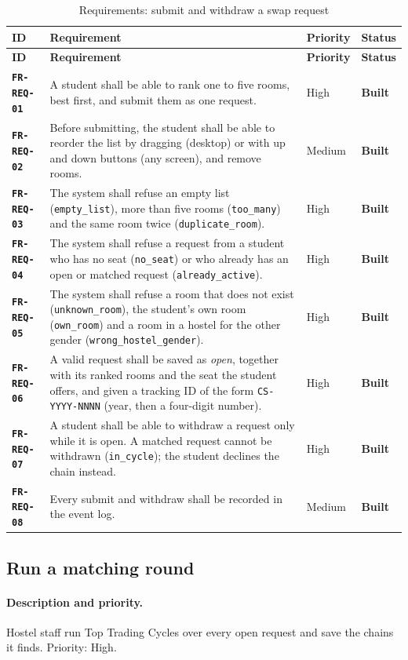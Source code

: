 \documentclass[11pt,a4paper,parskip=half,toc=listof]{scrreprt}
\newcommand{\Built}{\textcolor{builtgreen}{\textbf{Built}}}
\newcommand{\Req}[1]{\textbf{\texttt{#1}}}
\newcommand{\ReqHeader}{%
  \toprule
  \textbf{ID} & \textbf{Requirement} & \textbf{Priority} & \textbf{Status}\\
  \midrule}
\begin{document}
\begin{xltabular}{\linewidth}{@{}L{2.25cm}YL{1.55cm}L{1.6cm}@{}}
  \caption{Requirements: submit and withdraw a swap request}\label{tab:fr-req}\\
  \ReqHeader
  \endfirsthead
  \ReqHeader
  \endhead
  \bottomrule
  \endlastfoot
  \Req{FR-REQ-01} & A student shall be able to rank one to five rooms, best
    first, and submit them as one request. & High & \Built\\
  \Req{FR-REQ-02} & Before submitting, the student shall be able to
    reorder the list by dragging (desktop) or with up and down buttons
    (any screen), and remove rooms. & Medium & \Built\\
  \Req{FR-REQ-03} & The system shall refuse an empty list
    (\texttt{empty\_list}), more than five rooms (\texttt{too\_many}) and
    the same room twice (\texttt{duplicate\_room}). & High & \Built\\
  \Req{FR-REQ-04} & The system shall refuse a request from a student who
    has no seat (\texttt{no\_seat}) or who already has an open or matched
    request (\texttt{already\_active}). & High & \Built\\
  \Req{FR-REQ-05} & The system shall refuse a room that does not exist
    (\texttt{unknown\_room}), the student's own room (\texttt{own\_room}) and
    a room in a hostel for the other gender
    (\texttt{wrong\_hostel\_gender}). & High & \Built\\
  \Req{FR-REQ-06} & A valid request shall be saved as \emph{open}, together
    with its ranked rooms and the seat the student offers, and given a
    tracking ID of the form \texttt{CS-YYYY-NNNN} (year, then a four-digit
    number). & High & \Built\\
  \Req{FR-REQ-07} & A student shall be able to withdraw a request only
    while it is open. A matched request cannot be withdrawn
    (\texttt{in\_cycle}); the student declines the chain instead. & High &
    \Built\\
  \Req{FR-REQ-08} & Every submit and withdraw shall be recorded in the
    event log. & Medium & \Built\\
\end{xltabular}

\subsection{Run a matching round}

\paragraph{Description and priority.} Hostel staff run Top Trading Cycles
over every open request and save the chains it finds. Priority: High.
\end{document}

